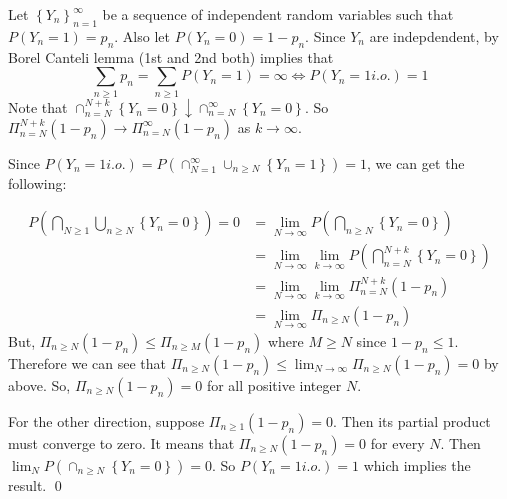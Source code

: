 \begin{problem}[4.3.4] \hfill

	Let $\left\{ Y_n \right\}_{n=1}^\infty$ be a sequence of independent random variables such that $P(Y_n = 1) = p_n$.
	Also let $P(Y_n = 0) = 1-p_n$.
	Since $Y_n$ are indepdendent, by Borel Canteli lemma (1st and 2nd both) implies that
\[
	\sum_{n\geq 1}p_n = \sum_{n\geq 1} P(Y_n = 1) = \infty \Leftrightarrow P(Y_n =1 i.o.) = 1
\]
	Note that $\cap_{n=N}^{N+k}\left\{ Y_n = 0 \right\} \downarrow \cap_{n=N}^{\infty}\left\{ Y_n = 0 \right\}$.
	So $\Pi_{n=N}^{N+k} (1-p_n) \rightarrow \Pi_{n=N}^\infty (1-p_n)$ as $k\rightarrow \infty$.

	Since $P(Y_n = 1 i.o.) = P(\cap_{N=1}^\infty \cup_{n \geq N} \left\{ Y_n = 1 \right\})=1$, we can get the following:

\[
	\begin{split}
		P(\bigcap_{N \geq 1} \bigcup_{n\geq N} \left\{ Y_n = 0 \right\}) = 0
		& = \lim_{N\rightarrow \infty} P\left( \bigcap_{n\geq N}\left\{ Y_n = 0 \right\} \right) \\
		& = \lim_{N\rightarrow \infty} \lim_{k\rightarrow \infty} P\left( \bigcap_{n=N}^{N+k}\left\{ Y_n = 0 \right\} \right)\\
		& = \lim_{N\rightarrow \infty} \lim_{k\rightarrow \infty} \Pi_{n=N}^{N+k}(1-p_n) \\
		& = \lim_{N\rightarrow \infty} \Pi_{n\geq N} (1-p_n)
	\end{split}
\]
But, $\Pi_{n\geq N} (1-p_n) \leq \Pi_{n\geq M} (1-p_n)$ where $M \geq N$ since $1-p_n \leq 1$.
Therefore we can see that $\Pi_{n\geq N} (1-p_n) \leq \lim_{N\rightarrow \infty}\Pi_{n\geq N}(1-p_n) = 0$ by above.
So, $\Pi_{n\geq N}(1-p_n) = 0$ for all positive integer $N$.

For the other direction, suppose $\Pi_{n \geq 1 } (1-p_n) = 0$. Then its partial product must converge to zero.
It means that $\Pi_{n\geq N} (1-p_n) = 0$ for every $N$.
Then $\lim_{N}P(\cap_{n\geq N}\left\{ Y_n  = 0 \right\}) = 0$.
So $P(Y_n = 1 i.o.) = 1$ which implies the result.
\qed
	
\end{problem}
